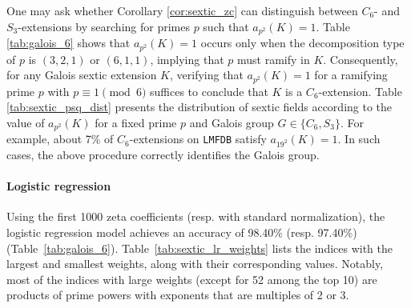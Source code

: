 \documentclass[letterpaper, 10pt]{article}
\newcommand{\1}{\mathds{1}}	%
\theoremstyle{definition}
\theoremstyle{remark}
\begin{document}
One may ask whether Corollary \ref{cor:sextic_zc} can distinguish between $C_6$- and $S_3$-extensions by searching for primes $p$ such that $a_{p^2}(K)=1$. Table \ref{tab:galois_6} shows that $a_{p^2}(K)=1$ occurs only when the decomposition type of $p$ is $(3,2,1)$ or $(6,1,1)$, implying that $p$ must ramify in $K$. Consequently, for any Galois sextic extension $K$, verifying that $a_{p^2}(K)=1$ for a ramifying prime $p$ with $p \equiv 1 \pmod{6}$ suffices to conclude that $K$ is a $C_6$-extension. Table \ref{tab:sextic_psq_dist} presents the distribution of sextic fields according to the value of $a_{p^2}(K)$ for a fixed prime $p$ and Galois group $G\in \{C_6,S_3\}$. For example, about 7\% of $C_6$-extensions  on \texttt{LMFDB} satisfy $a_{19^2}(K)=1$. In such cases, the above procedure correctly identifies the Galois group.

\paragraph{Logistic regression}

Using the first 1000 zeta coefficients (resp. with standard normalization), the logistic regression model achieves an accuracy of 98.40\% (resp. 97.40\%) (Table~\ref{tab:galois_6}).   Table~\ref{tab:sextic_lr_weights} lists the indices with the largest and smallest weights, along with their corresponding values. Notably, most of the indices with large weights (except for 52 among the top 10) are products of prime powers with exponents that are multiples of 2 or 3.

\begin{table}[h]
    \begin{center}
        \caption{Indices of the 10 largest and smallest weights (with actual weight values in parentheses) among 1000 logistic regression coefficients used to classify Galois groups of sextic fields  with normalized zeta coefficients. The bold numbers correspond to indices that are products of prime powers with exponents that are multiples of 2 or 3.}
        \label{tab:sextic_lr_weights}
    \end{center}
\end{table}
\end{document}
